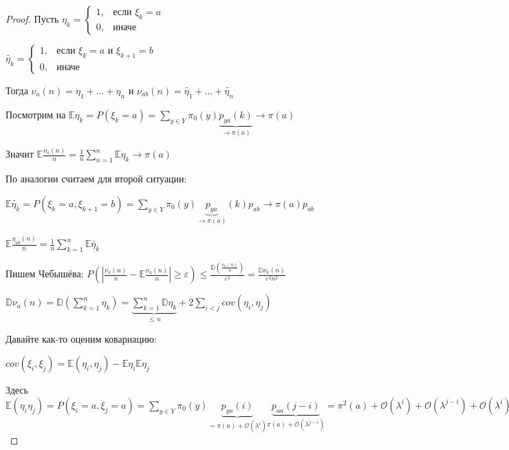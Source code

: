 \begin{proof}
    Пусть $\eta_k = 
    \begin{cases}
        1, & \text{если $\xi_k = a$}\\
        0, & \text{иначе}    
    \end{cases}$

    $\tilde{\eta_k} = 
    \begin{cases}
        1, & \text{если $\xi_k = a$ и $\xi_{k + 1} = b$}\\
        0, & \text{иначе}    
    \end{cases}$

    Тогда $\nu_a (n) = \eta_1 + \ldots + \eta_n$ и $\nu_{ab} (n) = \tilde{\eta_1} + \ldots + \tilde{\eta_n}$

    Посмотрим на $\mathbb{E} \eta_k = P(\xi_k = a) = \sum\limits_{y \in Y} \pi_0(y) \underbrace{p_{ya} (k)}_{\rightarrow \pi (a)} \rightarrow \pi (a)$

    Значит $\mathbb{E} \frac{\nu_a (n)}{n} = \frac{1}{n} \sum\limits_{n=1}^{n} \mathbb{E} \eta_k \rightarrow \pi (a)$

    По аналогии считаем для второй ситуации:

    $\mathbb{E} \tilde{\eta_k} = P(\xi_k = a, \xi_{k + 1} = b) = \sum\limits_{y \in Y} \pi_0 (y) \underbrace{p_{ya}}_{\rightarrow \pi (a)} (k) p_{ab}  \rightarrow \pi (a) p_{ab}$

    $\mathbb{E} \frac{\eta_{ab} (n)}{n} = \frac{1}{n} \sum\limits_{k=1}^{n} \mathbb{E} \tilde{\eta_k}$

    Пишем Чебышёва: $P \left( \left| \frac{\nu_a (n)}{n} - \mathbb{E} \frac{\nu_a (n)}{n} \right| \geqslant \varepsilon \right) \leqslant \frac{\mathbb{D} \left( \frac{\nu_a (n)}{n} \right)}{\varepsilon^2} = \frac{\mathbb{D} \nu_a (n)}{\varepsilon^2 n^2}$

    $\mathbb{D} \nu_a (n) = \mathbb{D} (\sum_{k=1}^{n} \eta_k) = \underbrace{\sum_{k = 1}^{n} \mathbb{D} \eta_k}_{\leqslant n} + 2\sum\limits_{i < j} cov (\eta_i, \eta_j)$

    Давайте как-то оценим ковариацию:

    $cov (\xi_i, \xi_j) = \mathbb{E} (\eta_i, \eta_j) - \mathbb{E} \eta_i \mathbb{E} \eta_j$

    Здесь $\mathbb{E} (\eta_i \eta_j) = P(\xi_i = a, \xi_j = a) = \sum\limits_{y \in Y} \pi_0 (y) \underbrace{p_{ya} (i)}_{= \pi (a) + \mathcal{O}(\lambda^i)} \underbrace{p_{aa} (j - i)}_{\pi (a) + \mathcal{O} (\lambda^{j - i})} = \pi^2 (a) + \mathcal{O} (\lambda^i) + \mathcal{O} (\lambda^{j - i}) + \mathcal{O} (\lambda^i)$


\end{proof}

